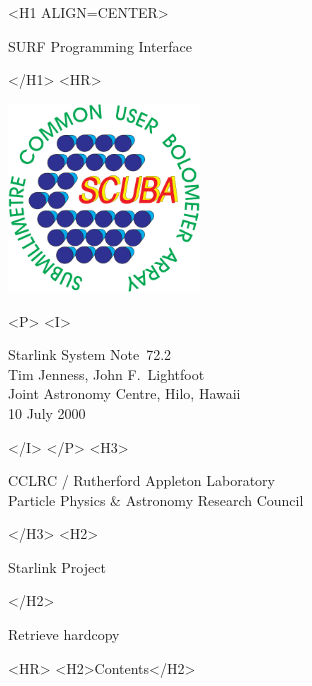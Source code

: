 \documentclass[twoside,11pt]{article}
\newcommand{\stardoccategory}  {Starlink System Note}
\newcommand{\stardocsource}    {ssn\stardocnumber}
\newcommand{\stardocnumber}    {72.2}
\newcommand{\stardocauthors}   {Tim Jenness, John F.\ Lightfoot\\
                                Joint Astronomy Centre, Hilo, Hawaii}
\newcommand{\stardocdate}      {10 July 2000}
\newcommand{\stardoctitle}     {SURF Programming Interface}
\newcommand{\htmladdnormallink}[2]{#1}
\newcommand{\htmladdimg}[1]{}
\newcommand{\htmlref}[2]{#1}
\newcommand{\htmladdtonavigation}[1]{}
\newcommand{\xlabel}[1]{}
\renewcommand{\_}{\texttt{\symbol{95}}}
\begin{document}
\begin{htmlonly}
   \xlabel{}
   \begin{rawhtml} <H1 ALIGN=CENTER> \end{rawhtml}
      \stardoctitle
   \begin{rawhtml} </H1> <HR> \end{rawhtml}

\includegraphics[width=2.0in]{ssn72_logo}

   \begin{rawhtml} <P> <I> \end{rawhtml}
   \stardoccategory\ \stardocnumber \\
   \stardocauthors \\
   \stardocdate
   \begin{rawhtml} </I> </P> <H3> \end{rawhtml}
      \htmladdnormallink{CCLRC}{http://www.cclrc.ac.uk} /
      \htmladdnormallink{Rutherford Appleton Laboratory}
                        {http://www.cclrc.ac.uk/ral} \\
      \htmladdnormallink{Particle Physics \& Astronomy Research Council}
                        {http://www.pparc.ac.uk} \\
   \begin{rawhtml} </H3> <H2> \end{rawhtml}
      \htmladdnormallink{Starlink Project}{http://www.starlink.ac.uk/}
   \begin{rawhtml} </H2> \end{rawhtml}
   \htmladdnormallink{\htmladdimg{source.gif} Retrieve hardcopy}
      {http://www.starlink.ac.uk/cgi-bin/hcserver?\stardocsource}\\

  \label{stardoccontents}
  \begin{rawhtml}
    <HR>
    <H2>Contents</H2>
  \end{rawhtml}
  \htmladdtonavigation{\htmlref{\htmladdimg{contents_motif.gif}}
        {stardoccontents}}


\end{htmlonly}
\end{document}
